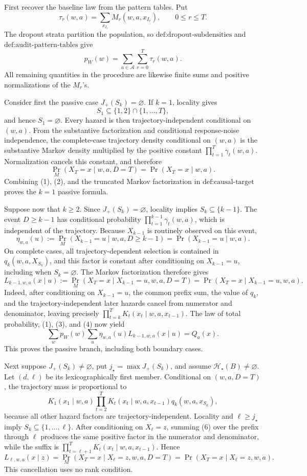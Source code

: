First recover the baseline law from the pattern tables.  Put
\[
\tau_r(w,a)=\sum_{x_{I_r}}M_r(w,a,x_{I_r}),\qquad 0\le r\le T.
\]
The dropout strata partition the population, so \(\text{def:dropout-subdensities}\) and \(\text{def:audit-pattern-tables}\) give
\[
p_W(w)=\sum_{a\in\mathcal A}\sum_{r=0}^T\tau_r(w,a).
\tag{1}
\]
All remaining quantities in the procedure are likewise finite sums and positive normalizations of the \(M_r\)'s.

Consider first the passive case \(J_+(S_k)=\varnothing\).  If \(k=1\), locality gives
\[
S_1\subseteq\{1,2\}\cap\{1,\ldots,T\},
\]
and hence \(S_1=\varnothing\).  Every hazard is then trajectory-independent conditional on \((w,a)\).  From the substantive factorization and conditional response-noise independence, the complete-case trajectory density conditional on \((w,a)\) is the substantive Markov density multiplied by the positive constant \(\prod_{t=1}^T\gamma_t(w,a)\).  Normalization cancels this constant, and therefore
\[
\Pr_M(X_T=x\mid w,a,D=T)=
\Pr(X_T=x\mid w,a).
\tag{2}
\]
Combining (1), (2), and the truncated Markov factorization in \(\text{def:causal-target}\) proves the \(k=1\) passive formula.

Suppose now that \(k\ge2\).  Since \(J_+(S_k)=\varnothing\), locality implies
\(S_k\subseteq\{k-1\}\).  The event \(D\ge k-1\) has conditional probability
\(\prod_{t=1}^{k-1}\gamma_t(w,a)\), which is independent of the trajectory.  Because \(X_{k-1}\) is routinely observed on this event,
\[
\eta_{w,a}(u)
:=\Pr_M(X_{k-1}=u\mid w,a,D\ge k-1)
=\Pr(X_{k-1}=u\mid w,a).
\tag{3}
\]
On complete cases, all trajectory-dependent selection is contained in
\(q_k(w,a,X_{S_k})\), and this factor is constant after conditioning on
\(X_{k-1}=u\), including when \(S_k=\varnothing\).  The Markov factorization therefore gives
\[
L_{k-1,w,a}(x\mid u)
:=\Pr_M(X_T=x\mid X_{k-1}=u,w,a,D=T)
=\Pr(X_T=x\mid X_{k-1}=u,w,a).
\tag{4}
\]
Indeed, after conditioning on \(X_{k-1}=u\), the common prefix sum, the value of \(q_k\), and the trajectory-independent later hazards cancel from numerator and denominator, leaving precisely
\(\prod_{t=k}^T K_t(x_t\mid w,a,x_{t-1})\).  The law of total probability, (1), (3), and (4) now yield
\[
\sum_w p_W(w)\sum_u\eta_{w,a}(u)L_{k-1,w,a}(x\mid u)
=Q_a(x).
\tag{5}
\]
This proves the passive branch, including both boundary cases.

Next suppose \(J_+(S_k)\ne\varnothing\), put
\(j_\star=\max J_+(S_k)\), and assume
\(\mathcal H_\star(B)\ne\varnothing\).  Let \((d,\ell)\) be its lexicographically first member.  Conditional on \((w,a,D=T)\), the trajectory mass is proportional to
\[
K_1(x_1\mid w,a)\prod_{t=2}^T K_t(x_t\mid w,a,x_{t-1})
q_k(w,a,x_{S_k}),
\tag{6}
\]
because all other hazard factors are trajectory-independent.  Locality and
\(\ell\ge j_\star\) imply \(S_k\subseteq\{1,\ldots,\ell\}\).  After conditioning on \(X_\ell=z\), summing (6) over the prefix through \(\ell\) produces the same positive factor in the numerator and denominator, while the suffix is
\(\prod_{t=\ell+1}^T K_t(x_t\mid w,a,x_{t-1})\).  Hence
\[
L_{\ell,w,a}(x\mid z)
=\Pr_M(X_T=x\mid X_\ell=z,w,a,D=T)
=\Pr(X_T=x\mid X_\ell=z,w,a).
\tag{7}
\]
This cancellation uses no rank condition.

